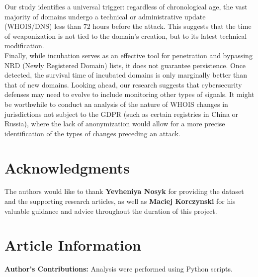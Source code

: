 \documentclass[final, 9pt, twocolumn]{saucis}
\begin{document}
Our study identifies a universal trigger: regardless of chronological age, the vast majority of domains undergo a technical or administrative update (WHOIS/DNS) less than 72 hours before the attack. This suggests that the time of weaponization is not tied to the domain's creation, but to its latest technical modification.\\

Finally, while incubation serves as an effective tool for penetration and bypassing NRD (Newly Registered Domain) lists, it does not guarantee persistence. Once detected, the survival time of incubated domains is only marginally better than that of new domains. Looking ahead, our research suggests that cybersecurity defenses may need to evolve to include monitoring other types of signals. It might be worthwhile to conduct an analysis of the nature of WHOIS changes in jurisdictions not subject to the GDPR (such as certain registries in China or Russia), where the lack of anonymization would allow for a more precise identification of the types of changes preceding an attack.


\section*{Acknowledgments}
The authors would like to thank \textbf{Yevheniya Nosyk} for providing the dataset and the supporting research articles, as well as \textbf{Maciej Korczynski} for his valuable guidance and advice throughout the duration of this project.

\vspace{0.2cm}

\section*{Article Information}
\vspace{0.2cm}

\textbf{Author's Contributions:}
Analysis were performed using Python scripts.
\vspace{0.2cm}
\end{document}
